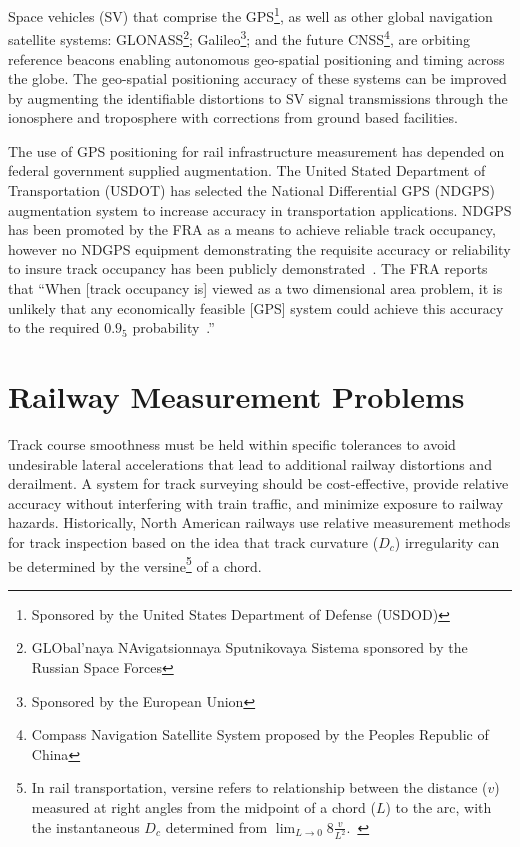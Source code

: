 Space vehicles (SV) that comprise the GPS\footnote{Sponsored by the United States Department of Defense (USDOD)}, as well as other global navigation satellite systems: GLONASS\footnote{GLObal'naya NAvigatsionnaya Sputnikovaya Sistema  sponsored by the Russian Space Forces}; Galileo\footnote{Sponsored by the European Union}; and the future CNSS\footnote{Compass Navigation Satellite System proposed by the Peoples Republic of China}, are orbiting reference beacons enabling autonomous geo-spatial positioning and timing across the globe. The geo-spatial positioning accuracy of these systems can be improved by augmenting the identifiable distortions to SV signal transmissions through the ionosphere and troposphere with corrections from ground based facilities. 

The use of GPS positioning for rail infrastructure measurement has depended on federal government supplied augmentation. The United Stated Department of Transportation (USDOT) has selected the National Differential GPS (NDGPS) augmentation system to increase accuracy in transportation applications. NDGPS has been promoted by the FRA as a means to achieve reliable track occupancy, however no NDGPS equipment demonstrating the requisite accuracy or reliability to insure track occupancy has been publicly demonstrated~\citep{2006AllenAssetMap}. The FRA reports that ``When [track occupancy is] viewed as a two dimensional area problem, it is unlikely that any economically feasible [GPS] system could achieve this accuracy to the required $0.9_5$ probability~\citep[pp.6-7]{1995FRADiffe}.''


\section{Railway Measurement Problems}
Track course smoothness must be held within specific tolerances to avoid undesirable lateral accelerations that lead to additional railway distortions and derailment. A system for track surveying should be cost-effective, provide relative accuracy without interfering with train traffic, and minimize exposure to railway hazards. Historically, North American railways use relative measurement methods for track inspection based on the idea that track curvature ($D_c$) irregularity can be determined by the versine\footnote{In rail transportation, versine refers to relationship between the distance ($v$) measured at right angles from the midpoint of a chord ($L$) to the arc, with the instantaneous  $D_c$ determined from $\displaystyle\lim_{L\to0} 8\frac{v}{L^2}$.~\citep{MundreyTrackEng}} of a chord.

